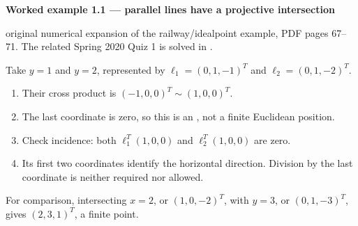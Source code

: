 \documentclass[letterpaper,11pt,english,openany,oneside]{jupyterBook}
\begin{document}
\begin{TextbookBox}
\textbf{Worked example 1.1 — parallel lines have a projective intersection}\par\smallskip

\sphinxAtStartPar
{} original numerical expansion of the railway/ideal\sphinxhyphen{}point example, PDF pages 67–71. The related Spring 2020 Quiz 1 is solved in {\hyperref[\detokenize{lectures/lecture01/quiz-practice:lec01-quiz-practice}]{}}.

\sphinxAtStartPar
Take \(y=1\) and \(y=2\), represented by \(\ell_1=(0,1,-1)^T\) and \(\ell_2=(0,1,-2)^T\).
\begin{enumerate}
%
\item {}
\sphinxAtStartPar
Their cross product is \((-1,0,0)^T\sim(1,0,0)^T\).

\item {}
\sphinxAtStartPar
The last coordinate is zero, so this is an , not a finite Euclidean position.

\item {}
\sphinxAtStartPar
Check incidence: both \(\ell_1^T(1,0,0)\) and \(\ell_2^T(1,0,0)\) are zero.

\item {}
\sphinxAtStartPar
Its first two coordinates identify the horizontal direction. Division by the last coordinate is neither required nor allowed.

\end{enumerate}

\sphinxAtStartPar
For comparison, intersecting \(x=2\), or \((1,0,-2)^T\), with \(y=3\), or \((0,1,-3)^T\), gives \((2,3,1)^T\), a finite point.

\end{TextbookBox}
\end{document}
